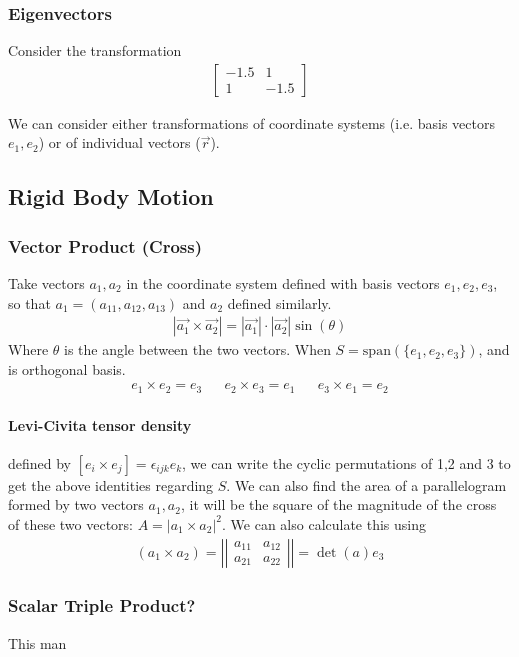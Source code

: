 \documentclass{article} \usepackage{amsmath} \usepackage{amssymb} \usepackage{amsthm} \usepackage[margin=0.2in]{geometry} \usepackage{hyperref} \usepackage{physics} \usepackage{tikz} \usepackage{mathtools} \mathtoolsset{showonlyrefs} \theoremstyle{definition} \newtheorem{theorem}{Theorem}[section] \newtheorem{corollary}{Corollary}[theorem] \newtheorem{lemma}[theorem]{Lemma} \newtheorem{definition}{Definition}[section] \author{Connor Duncan} \date{\today}
\begin{document}
\subsubsection{Eigenvectors} Consider the transformation \begin{align} \begin{bmatrix} -1.5 & 1\\ 1 & -1.5 \end{bmatrix} \end{align} \begin{center}  \end{center} We can consider either transformations of coordinate systems (i.e. basis vectors $e_1,e_2$) or of individual vectors ($\vec{r}$). \subsection{Rigid Body Motion} \subsubsection{Vector Product (Cross)} Take vectors $a_1,a_2$ in the coordinate system defined with basis vectors $e_1, e_2, e_3$, so that $a_1=(a_{11},a_{12},a_{13})$ and $a_2$ defined similarly. \begin{align} |\vec{a_1}\times\vec{a_2}|=|\vec{a_1}|\cdot|\vec{a_2}|\sin(\theta) \end{align} Where $\theta$ is the angle between the two vectors. When $S=\text{span}(\{e_1,e_2,e_3\})$, and is orthogonal basis. \begin{align} e_1\times e_2=e_3 && e_2\times e_3=e_1 && e_3\times e_1=e_2 \end{align} \paragraph{Levi-Civita tensor density} defined by $[e_i\times e_j]=\epsilon_{ijk}e_k$, we can write the cyclic permutations of 1,2 and 3 to get the above identities regarding $S$. We can also find the area of a parallelogram formed by two vectors $a_1, a_2$, it will be the square of the magnitude of the cross of these two vectors: $A=|a_1\times a_2|^2$. We can also calculate this using \begin{align} (a_1\times a_2)=\left|\left|\begin{matrix}a_{11} & a_{12}\\ a_{21} & a_{22}\end{matrix}\right|\right|=\det(a)e_3 \end{align} \subsubsection{Scalar Triple Product?} This man 
\end{document}
